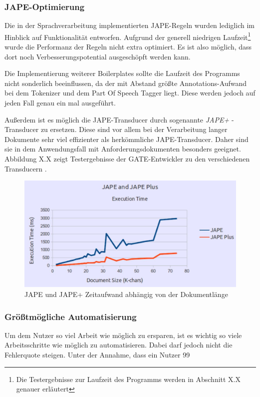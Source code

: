 \documentclass[12pt]{report}
\begin{document}
\subsubsection{JAPE-Optimierung}
Die in der Sprachverarbeitung implementierten JAPE-Regeln wurden lediglich im Hinblick auf Funktionalität entworfen. Aufgrund der generell niedrigen Laufzeit\footnote{Die Testergebnisse zur Laufzeit des Programms werden in Abschnitt X.X genauer erläutert} wurde die Performanz der Regeln nicht extra optimiert. Es ist also möglich, dass dort noch Verbesserungspotential ausgeschöpft werden kann. 

Die Implementierung weiterer Boilerplates sollte die Laufzeit des Programms nicht sonderlich beeinflussen, da der mit Abstand größte Annotations-Aufwand bei dem Tokenizer und dem Part Of Speech Tagger liegt. Diese werden jedoch auf jeden Fall genau ein mal ausgeführt. 

Außerdem ist es möglich die JAPE-Transducer durch sogenannte \textit{JAPE+} -Transducer zu ersetzen. Diese sind vor allem bei der Verarbeitung langer Dokumente sehr viel effizienter als herkömmliche JAPE-Transducer. Daher sind sie in dem Anwendungsfall mit Anforderungsdokumenten besonders geeignet. Abbildung X.X zeigt Testergebnisse der GATE-Entwickler zu den verschiedenen Transducern \cite{gm19}.

\begin{figure}[H]
\begin{center}
\includegraphics[scale=0.7]{Bilder/TransducerTest.jpg}
\caption{JAPE und JAPE+ Zeitaufwand abhängig von der Dokumentlänge \cite{gm19}}
\end{center}
\end{figure}

\subsubsection{Größtmögliche Automatisierung}
Um dem Nutzer so viel Arbeit wie möglich zu ersparen, ist es wichtig so viele Arbeitsschritte wie möglich zu automatisieren. Dabei darf jedoch nicht die Fehlerquote steigen. Unter der Annahme, dass ein Nutzer 99%
\end{document}
